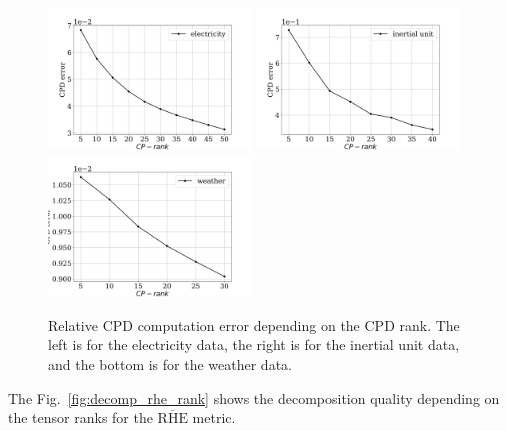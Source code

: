 \documentclass[referee, pdflatex, sn-mathphys-num]{sn-jnl}
\theoremstyle{definition}
\theoremstyle{plain}
\begin{document}
		\begin{figure}[h]
			\centering
			\includegraphics[width=0.48\textwidth, keepaspectratio]{CPD_error_elec.png}
			\includegraphics[width=0.48\textwidth, keepaspectratio]{CPD_error_motion.png}
			\includegraphics[width=0.48\textwidth, keepaspectratio]{CPD_error_weather.png}
			\caption{Relative CPD computation error depending on the CPD rank. The left is for the electricity data, the right is for the inertial unit data, and the bottom is for the weather data.}\label{fig:cpd_errors}
		\end{figure}
		
		The Fig.~\ref{fig:decomp_rhe_rank} shows the decomposition quality depending on the tensor ranks for the $ \overline{\text{RHE}} $ metric.
		
\end{document}
